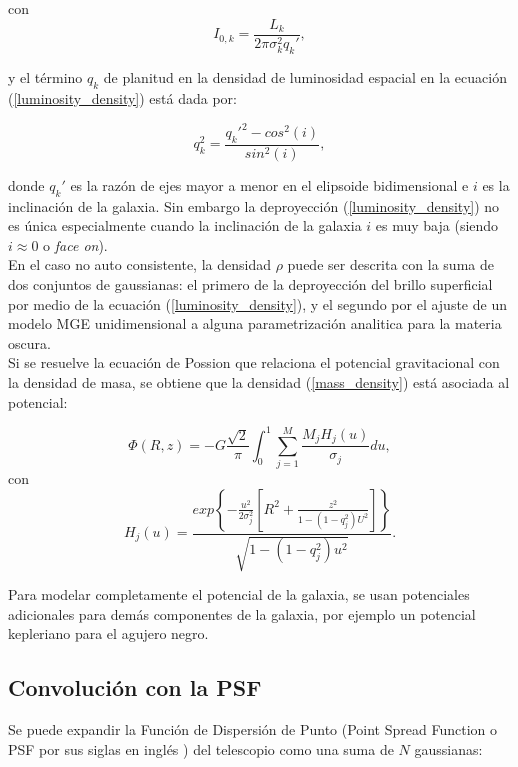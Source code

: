con $$ I_{0,k} = \frac{L_k}{ 2\pi \sigma_k^2 q_k' }, $$ 

y el término $q_k$ de planitud en la densidad de luminosidad espacial en la ecuación (\ref{luminosity_density}) está dada por:

\begin{equation}
\label{flattening}
q_k^2 = \frac{ q_k'^2 - cos^2 (i) }{ sin^2 (i) },
\end{equation}

donde $q_k'$ es la razón de ejes mayor a menor en el elipsoide bidimensional e $i$ es la inclinación de la galaxia. Sin embargo la deproyección (\ref{luminosity_density}) no es única especialmente cuando la inclinación de la galaxia $i$ es muy baja (siendo $i\approx 0$ o \emph{face on}).\\


En el caso no auto consistente, la densidad $\rho $ puede ser descrita con la suma de dos conjuntos de gaussianas: el primero de la deproyección del brillo superficial por medio de la ecuación (\ref{luminosity_density}), y el segundo por el ajuste de un modelo MGE unidimensional a alguna parametrización analitica para la materia oscura.\\

Si se resuelve la ecuación de Possion que relaciona el potencial gravitacional con la densidad de masa, se obtiene que la densidad (\ref{mass_density}) está asociada al potencial:

\begin{equation}
\label{potential_gaussians}
\Phi(R, z) = - G \frac{\sqrt{2} }{\pi} \int_0^1 \sum_{j=1}^M \frac{M_j H_j(u)}{\sigma_j} du,
\end{equation}
con
\begin{equation}
H_j(u) = \frac{exp \left \{ -\frac{u^2}{2\sigma_j^2} \left[ R^2 + \frac{z^2}{1-(1-q_j^2)U^2} \right ] \right \}  }{ \sqrt{1-(1-q_j^2)u^2 } }.
\end{equation}

Para modelar completamente el potencial de la galaxia, se usan potenciales adicionales para demás componentes de la galaxia, por ejemplo un potencial kepleriano para el agujero negro.\\



\subsection{Convolución con la PSF}

Se puede expandir la Función de Dispersión de Punto  (Point Spread Function o PSF por sus siglas en inglés ) del telescopio como una suma de $N$ gaussianas:

